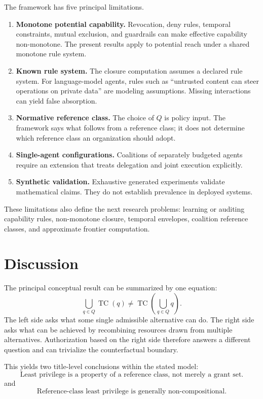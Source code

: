 \documentclass[11pt]{article}
\newcommand{\TC}{\operatorname{TC}}
\begin{document}
The framework has five principal limitations.

\begin{enumerate}[leftmargin=*]
\item \textbf{Monotone potential capability.} Revocation, deny rules, temporal constraints, mutual exclusion, and guardrails can make effective capability non-monotone. The present results apply to potential reach under a shared monotone rule system.
\item \textbf{Known rule system.} The closure computation assumes a declared rule system. For language-model agents, rules such as ``untrusted content can steer operations on private data'' are modeling assumptions. Missing interactions can yield false absorption.
\item \textbf{Normative reference class.} The choice of $Q$ is policy input. The framework says what follows from a reference class; it does not determine which reference class an organization should adopt.
\item \textbf{Single-agent configurations.} Coalitions of separately budgeted agents require an extension that treats delegation and joint execution explicitly.
\item \textbf{Synthetic validation.} Exhaustive generated experiments validate mathematical claims. They do not establish prevalence in deployed systems.
\end{enumerate}

These limitations also define the next research problems: learning or auditing capability rules, non-monotone closure, temporal envelopes, coalition reference classes, and approximate frontier computation.

\section{Discussion}

The principal conceptual result can be summarized by one equation:
\[
\boxed{
\bigcup_{q\in Q}\TC(q)
\neq
\TC\left(\bigcup_{q\in Q}q\right).
}
\]
The left side asks what some single admissible alternative can do. The right side asks what can be achieved by recombining resources drawn from multiple alternatives. Authorization based on the right side therefore answers a different question and can trivialize the counterfactual boundary.

This yields two title-level conclusions within the stated model:
\[
\boxed{\text{Least privilege is a property of a reference class, not merely a grant set.}}
\]
and
\[
\boxed{\text{Reference-class least privilege is generally non-compositional.}}
\]
\end{document}
